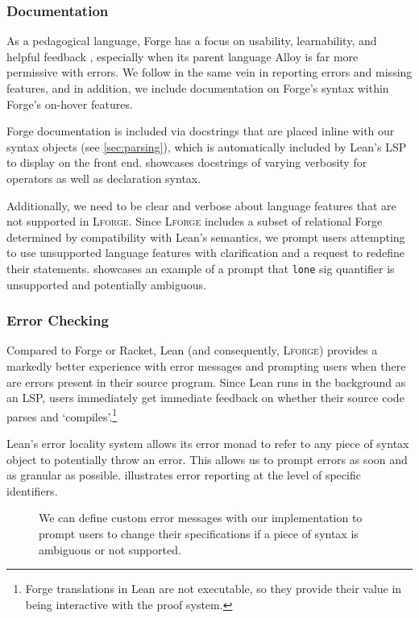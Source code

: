 \subsubsection{Documentation}

As a pedagogical language, Forge has a focus on usability, learnability, and helpful feedback \cite{ngpdbccdlrrvwwk-oopsla-2024}, especially when its parent language Alloy is far more permissive with errors. We follow in the same vein in reporting errors and missing features, and in addition, we include documentation on Forge's syntax within Forge's on-hover features. 

Forge documentation is included via docstrings that are placed inline with our syntax objects (see \cref{sec:parsing}), which is automatically included by Lean's LSP to display on the front end.  showcases docstrings of varying verbosity for operators as well as declaration syntax. 

Additionally, we need to be clear and verbose about language features that are not supported in \textsc{Lforge}. Since \textsc{Lforge} includes a subset of relational Forge determined by compatibility with Lean's semantics, we prompt users attempting to use unsupported language features with clarification and a request to redefine their statements.  showcases an example of a prompt that \texttt{lone} sig quantifier is unsupported and potentially ambiguous. 

\subsubsection{Error Checking}

Compared to Forge or Racket, Lean (and consequently, \textsc{Lforge}) provides a markedly better experience with error messages and prompting users when there are errors present in their source program. Since Lean runs in the background as an LSP, users immediately get immediate feedback on whether their source code parses and `compiles'.\footnote{Forge translations in Lean are not executable, so they provide their value in being interactive with the proof system.}

Lean's error locality system allows its error monad to refer to any piece of syntax object to potentially throw an error. This allows us to prompt errors as soon and as granular as possible.  illustrates error reporting at the level of specific identifiers. 

\begin{figure}[h!]
  \centering
  \caption{We can define custom error messages with our implementation to prompt users to change their specifications if a piece of syntax is ambiguous or not supported.}
  \label{fig:sc-unsupported}
\end{figure}

